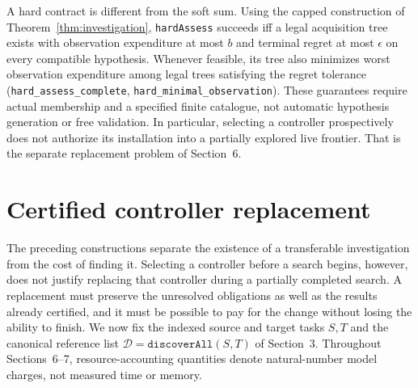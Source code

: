 \documentclass[10pt,letterpaper]{article}
\newcommand{\CanonRef}{\mathcal D}
\newcommand{\rc}[1]{\texttt{#1}}
\begin{document}
A hard contract is different from the soft sum. Using the capped construction of Theorem~\ref{thm:investigation}, \rc{hardAssess} succeeds iff a legal acquisition tree exists with observation expenditure at most $b$ and terminal regret at most $\epsilon$ on every compatible hypothesis. Whenever feasible, its tree also minimizes worst observation expenditure among legal trees satisfying the regret tolerance (\rc{hard\_assess\_complete}, \rc{hard\_minimal\_observation}). These guarantees require actual membership and a specified finite catalogue, not automatic hypothesis generation or free validation. In particular, selecting a controller prospectively does not authorize its installation into a partially explored live frontier. That is the separate replacement problem of Section~6.
\clearpage
\section{Certified controller replacement}\label{sec:replacement}
The preceding constructions separate the existence of a transferable investigation from the cost of finding it. Selecting a controller before a search begins, however, does not justify replacing that controller during a partially completed search. A replacement must preserve the unresolved obligations as well as the results already certified, and it must be possible to pay for the change without losing the ability to finish. We now fix the indexed source and target tasks $S,T$ and the canonical reference list $\CanonRef=\rc{discoverAll}(S,T)$ of Section~3. Throughout Sections~6--7, resource-accounting quantities denote natural-number model charges, not measured time or memory.
\end{document}
